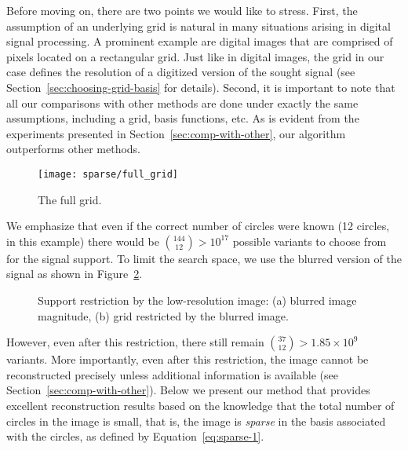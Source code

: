 Before moving on, there are two points we would like to stress. First,
the assumption of an underlying grid is natural in many situations
arising in digital signal processing. A prominent example are digital
images that are comprised of pixels located on a rectangular
grid. Just like in digital images, the grid in our case defines the
resolution of a digitized version of the sought signal (see
Section~\ref{sec:choosing-grid-basis} for details). Second, it is
important to note that all our comparisons with other methods are done
under exactly the same assumptions, including a grid, basis functions,
etc. As is evident from the experiments presented in
Section~\ref{sec:comp-with-other}, our algorithm outperforms other
methods.
\begin{figure}[H]
  \centering
  \texttt{[image: sparse/full\_grid]}
  \caption{The full grid.}
  \label{fig:full-grid}
\end{figure}
We emphasize  that even if the correct number of circles were known
(12 circles, in this example) there
would be ${144 \choose 12} > 10^{17}$ possible variants to choose from for
the signal support. To limit the search space, we use the blurred version
of the signal as shown in Figure~\ref{fig:grid-restriction}.
\begin{figure}[H]
  \centering
  \qquad{}
  \caption[Support restriction by the low-resolution image]{Support restriction by the low-resolution image: (a)
    blurred image magnitude, (b) grid restricted by the blurred
    image.}
  \label{fig:grid-restriction}
\end{figure}
However, even after this restriction, there still remain ${37 \choose 12}
> 1.85\times 10^{9}$ variants. More importantly,
even after this restriction, the image cannot be reconstructed
precisely unless additional information is available (see
Section~\ref{sec:comp-with-other}). Below we present
our method that provides excellent reconstruction results based on the
knowledge that the total number of circles in the image is small,
that is, the image is \emph{sparse} in the basis associated with the
circles, as defined by Equation~\eqref{eq:sparse-1}.

